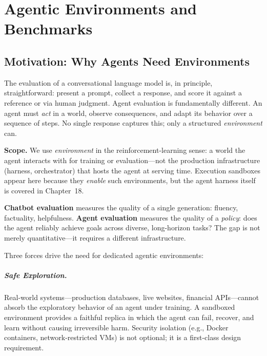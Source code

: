 \chapter{Agentic Environments and Benchmarks}
\label{sec:agentic-environments}

\section{Motivation: Why Agents Need Environments}
\label{sec:env-motivation}

The evaluation of a conversational language model is, in principle, straightforward: present a prompt, collect a response, and score it against a reference or via human judgment. Agent evaluation is fundamentally different. An agent must \emph{act} in a world, observe consequences, and adapt its behavior over a sequence of steps. No single response captures this; only a structured \emph{environment} can.

\textbf{Scope.} We use \emph{environment} in the reinforcement-learning sense: a world the agent interacts with for training or evaluation---not the production infrastructure (harness, orchestrator) that hosts the agent at serving time. Execution sandboxes appear here because they \emph{enable} such environments, but the agent harness itself is covered in Chapter~18.

\begin{keybox}
\textbf{Chatbot evaluation} measures the quality of a single generation: fluency, factuality, helpfulness. \textbf{Agent evaluation} measures the quality of a \emph{policy}: does the agent reliably achieve goals across diverse, long-horizon tasks? The gap is not merely quantitative---it requires a different infrastructure.
\end{keybox}

Three forces drive the need for dedicated agentic environments:

\paragraph{Safe Exploration.}
\label{safe-exploration.}

Real-world systems---production databases, live websites, financial APIs---cannot absorb the exploratory behavior of an agent under training. A sandboxed environment provides a faithful replica in which the agent can fail, recover, and learn without causing irreversible harm. Security isolation (e.g., Docker containers, network-restricted VMs) is not optional; it is a first-class design requirement.

